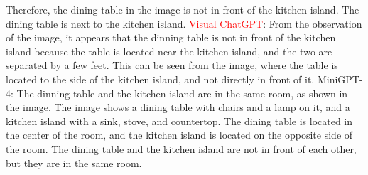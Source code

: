 \begin{enumerate}
    Therefore, the dining table in the image is not in front of the kitchen island. The dining table is next to the kitchen island.
    \subitem \textcolor{red}{Visual ChatGPT}: From the observation of the image, it appears that the dinning table is not in front of the kitchen island because the table is located near the kitchen island, and the two are separated by a few feet. This can be seen from the image, where the table is located to the side of the kitchen island, and not directly in front of it.
    \subitem MiniGPT-4: The dinning table and the kitchen island are in the same room, as shown in the image. The image shows a dining table with chairs and a lamp on it, and a kitchen island with a sink, stove, and countertop. The dining table is located in the center of the room, and the kitchen island is located on the opposite side of the room. The dining table and the kitchen island are not in front of each other, but they are in the same room.
\end{enumerate}
